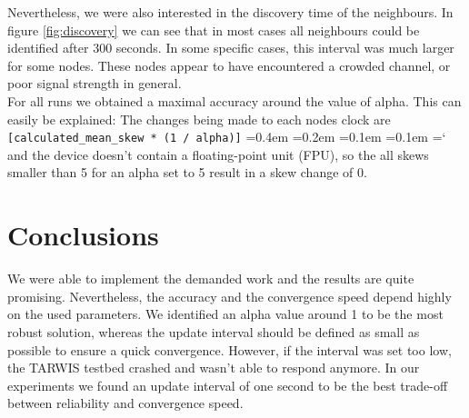 \documentclass{llncs}
\newcommand{\code}[1]{%
	\texttt{#1}%
	\fontdimen2\font=0.4em
	\fontdimen3\font=0.2em
	\fontdimen4\font=0.1em
	\fontdimen7\font=0.1em
	\hyphenchar\font=`\-
}
\begin{document}
\noindent Nevertheless, we were also interested in the discovery time of the neighbours. In figure \ref{fig:discovery} we can see that in most cases all neighbours could be identified after 300 seconds. In some specific cases, this interval was much larger for some nodes. These nodes appear to have encountered a crowded channel, or poor signal strength in general.\\



\noindent For all runs we obtained a maximal accuracy around the value of alpha. This can easily be explained: The changes being made to each nodes clock are \code{[calculated\_mean\_skew * (1 / alpha)]} and the device doesn't contain a float\-ing-point unit (FPU), so the all skews smaller than 5 for an alpha set to 5 result in a skew change of 0.


\section{Conclusions}

We were able to implement the demanded work and the results are quite promising. Nevertheless, the accuracy and the convergence speed depend highly on the used parameters. We identified an alpha value around 1 to be the most robust solution, whereas the update interval should be defined as small as possible to ensure a quick convergence. However, if the interval was set too low, the TARWIS testbed crashed and wasn't able to respond anymore. In our experiments we found an update interval of one second to be the best trade-off between reliability and convergence speed. 

{}



%
%
\end{document}
